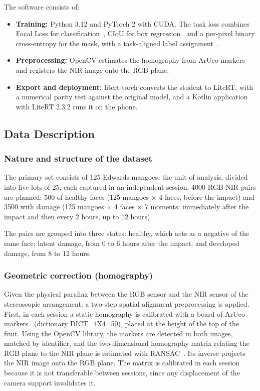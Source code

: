 \documentclass[journal]{IEEEtran}
\begin{document}
The software consists of:
\begin{itemize}
\item \textbf{Training:} Python 3.12 and PyTorch 2 with CUDA. The task loss combines Focal Loss for classification~\cite{lin2017}, CIoU for box regression~\cite{zheng2020} and a per-pixel binary cross-entropy for the mask, with a task-aligned label assignment~\cite{feng2021}.
\item \textbf{Preprocessing:} OpenCV estimates the homography from ArUco markers and registers the NIR image onto the RGB plane.
\item \textbf{Export and deployment:} litert-torch converts the student to LiteRT, with a numerical parity test against the original model, and a Kotlin application with LiteRT 2.3.2 runs it on the phone.
\end{itemize}

\subsection{Data Description}\label{sec:data}
\subsubsection{Nature and structure of the dataset}\label{sec:structure}
The primary set consists of 125 Edwards mangoes, the unit of analysis, divided into five lots of 25, each captured in an independent session. 4000 RGB-NIR pairs are planned: 500 of healthy faces (125 mangoes $\times$ 4 faces, before the impact) and 3500 with damage (125 mangoes $\times$ 4 faces $\times$ 7 moments: immediately after the impact and then every 2 hours, up to 12 hours).

The pairs are grouped into three states: healthy, which acts as a negative of the same face; latent damage, from 0 to 6 hours after the impact; and developed damage, from 8 to 12 hours.

\subsubsection{Geometric correction (homography)}\label{sec:homography}
Given the physical parallax between the RGB sensor and the NIR sensor of the stereoscopic arrangement, a two-step spatial alignment preprocessing is applied. First, in each session a static homography is calibrated with a board of ArUco markers~\cite{garrido2014} (dictionary DICT\_4X4\_50), placed at the height of the top of the fruit. Using the OpenCV library, the markers are detected in both images, matched by identifier, and the two-dimensional homography matrix relating the RGB plane to the NIR plane is estimated with RANSAC~\cite{fischler1981}. Its inverse projects the NIR image onto the RGB plane. The matrix is calibrated in each session because it is not transferable between sessions, since any displacement of the camera support invalidates it.
\end{document}

